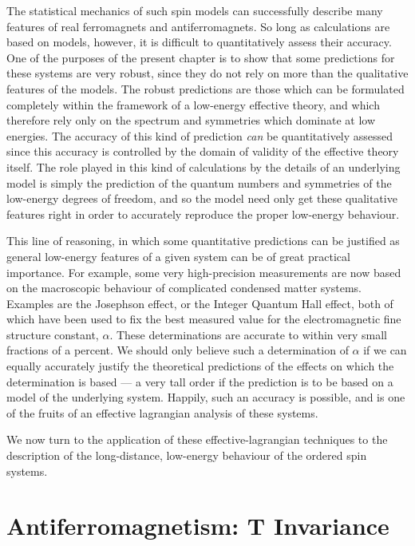 \documentclass[12pt]{report}
\begin{document}
The statistical mechanics of such spin models can
successfully describe many features of real ferromagnets
and antiferromagnets. So long as calculations are based on
models, however, it is difficult to quantitatively assess
their accuracy. One of the purposes of the present chapter
is to show that some predictions for these systems are very
robust, since they do not rely on more than the qualitative
features of the models. The robust predictions are those
which can be formulated completely within the framework of
a low-energy effective theory, and which therefore rely
only on the spectrum and symmetries which dominate at low
energies. The accuracy of this kind of prediction {\em can}
be quantitatively assessed since this accuracy is controlled
by the domain of validity of the effective theory itself.
The role played in this kind of calculations by the details
of an underlying model is simply the prediction of the
quantum numbers and symmetries of the low-energy degrees of
freedom, and so the model need only get these qualitative
features right in order to accurately reproduce the proper
low-energy behaviour.

This line of reasoning, in which some quantitative
predictions can be justified as general low-energy features
of a given system can be of great practical importance. For
example, some very high-precision measurements are now
based on the macroscopic behaviour of complicated condensed
matter systems. Examples are the Josephson effect, or the
Integer Quantum Hall effect, both of which have been used
to fix the best measured value for the electromagnetic fine
structure constant, $\alpha$. These determinations are
accurate to within very small fractions of a percent. We
should only believe such a determination of $\alpha$ if we can
equally accurately justify the theoretical predictions of
the effects on which the determination is based --- a very
tall order if the prediction is to be based on a model of
the underlying system. Happily, such an accuracy is
possible, and is one of the fruits of an effective
lagrangian analysis of these systems.

We now turn to the application of these
effective-lagrangian techniques to the description of the
long-distance, low-energy behaviour of the ordered spin
systems.

\section{Antiferromagnetism: T Invariance}
\end{document}
